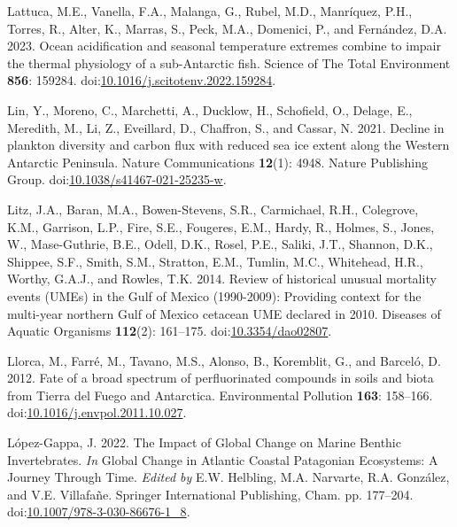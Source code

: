 \documentclass[
]{article}
\newlength{\cslhangindent}
\newenvironment{CSLReferences}[2] %
 {\begin{list}{}{%
  \setlength{\itemindent}{0pt}
  \setlength{\leftmargin}{0pt}
  \setlength{\parsep}{0pt}
  \ifodd #1
   \setlength{\leftmargin}{\cslhangindent}
   \setlength{\itemindent}{-1\cslhangindent}
  \fi
  \setlength{\itemsep}{#2\baselineskip}}}
 {\end{list}}
\begin{document}
\begin{CSLReferences}{1}{0}
Lattuca, M.E., Vanella, F.A., Malanga, G., Rubel, M.D., Manríquez, P.H.,
Torres, R., Alter, K., Marras, S., Peck, M.A., Domenici, P., and
Fernández, D.A. 2023. Ocean acidification and seasonal temperature
extremes combine to impair the thermal physiology of a sub-{Antarctic}
fish. Science of The Total Environment \textbf{856}: 159284.
doi:\href{https://doi.org/10.1016/j.scitotenv.2022.159284}{10.1016/j.scitotenv.2022.159284}.

Lin, Y., Moreno, C., Marchetti, A., Ducklow, H., Schofield, O., Delage,
E., Meredith, M., Li, Z., Eveillard, D., Chaffron, S., and Cassar, N.
2021. Decline in plankton diversity and carbon flux with reduced sea ice
extent along the {Western Antarctic Peninsula}. Nature Communications
\textbf{12}(1): 4948. Nature Publishing Group.
doi:\href{https://doi.org/10.1038/s41467-021-25235-w}{10.1038/s41467-021-25235-w}.

Litz, J.A., Baran, M.A., Bowen-Stevens, S.R., Carmichael, R.H.,
Colegrove, K.M., Garrison, L.P., Fire, S.E., Fougeres, E.M., Hardy, R.,
Holmes, S., Jones, W., Mase-Guthrie, B.E., Odell, D.K., Rosel, P.E.,
Saliki, J.T., Shannon, D.K., Shippee, S.F., Smith, S.M., Stratton, E.M.,
Tumlin, M.C., Whitehead, H.R., Worthy, G.A.J., and Rowles, T.K. 2014.
Review of historical unusual mortality events ({UMEs}) in the {Gulf} of
{Mexico} (1990-2009): Providing context for the multi-year northern
{Gulf} of {Mexico} cetacean {UME} declared in 2010. Diseases of Aquatic
Organisms \textbf{112}(2): 161--175.
doi:\href{https://doi.org/10.3354/dao02807}{10.3354/dao02807}.

Llorca, M., Farré, M., Tavano, M.S., Alonso, B., Koremblit, G., and
Barceló, D. 2012. Fate of a broad spectrum of perfluorinated compounds
in soils and biota from {Tierra} del {Fuego} and {Antarctica}.
Environmental Pollution \textbf{163}: 158--166.
doi:\href{https://doi.org/10.1016/j.envpol.2011.10.027}{10.1016/j.envpol.2011.10.027}.

López-Gappa, J. 2022. The {Impact} of {Global Change} on {Marine Benthic
Invertebrates}. \emph{In} Global {Change} in {Atlantic Coastal
Patagonian Ecosystems}: {A Journey Through Time}. \emph{Edited by} E.W.
Helbling, M.A. Narvarte, R.A. González, and V.E. Villafañe. Springer
International Publishing, Cham. pp. 177--204.
doi:\href{https://doi.org/10.1007/978-3-030-86676-1_8}{10.1007/978-3-030-86676-1\_8}.


\end{CSLReferences}
\end{document}
